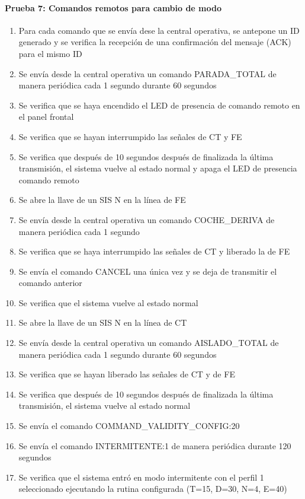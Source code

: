 \paragraph{Prueba 7: Comandos remotos para cambio de modo}
\begin{enumerate}
\item	Para cada comando que se envía dese la central operativa, se antepone un ID generado y se verifica la recepción de una confirmación del mensaje (ACK) para el mismo ID
\item	Se envía desde la central operativa un comando PARADA\_TOTAL de manera periódica cada 1 segundo durante 60 segundos
\item	Se verifica que se haya encendido el LED de presencia de comando remoto en el panel frontal
\item	Se verifica que se hayan interrumpido las señales de CT y FE
\item	Se verifica que después de 10 segundos después de finalizada la última transmisión, el sistema vuelve al estado normal y apaga el LED de presencia comando remoto
\item	Se abre la llave de un SIS N en la línea de FE
\item	Se envía desde la central operativa un comando COCHE\_DERIVA de manera periódica cada 1 segundo 
\item	Se verifica que se haya interrumpido las señales de CT y liberado la de FE
\item	Se envía el comando CANCEL una única vez y se deja de transmitir el comando anterior
\item	Se verifica que el sistema vuelve al estado normal
\item	Se abre la llave de un SIS N en la línea de CT
\item	Se envía desde la central operativa un comando AISLADO\_TOTAL de manera periódica cada 1 segundo durante 60 segundos
\item	Se verifica que se hayan liberado las señales de CT y de FE
\item	Se verifica que después de 10 segundos después de finalizada la última transmisión, el sistema vuelve al estado normal
\item	Se envía el comando COMMAND\_VALIDITY\_CONFIG:20
\item	Se envía el comando INTERMITENTE:1 de manera periódica durante 120 segundos
\item	Se verifica que el sistema entró en modo intermitente con el perfil 1 seleccionado ejecutando la rutina configurada (T=15, D=30, N=4, E=40)

\end{enumerate}
